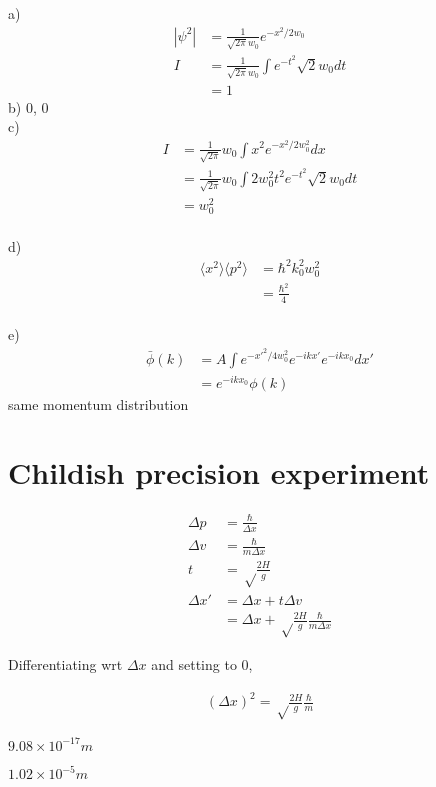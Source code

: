 \documentclass{article}
\newcommand{\<}{\langle}
\renewcommand{\>}{\rangle}
\newcommand{\D}{\Delta}
\begin{document}
a)
\begin{align*}
|\psi^2| &= \frac{1}{\sqrt{2\pi} w_0} e^{-x^2/2w_0} \\
I &= \frac{1}{\sqrt{2\pi} w_0} \int e^{-t^2} \sqrt 2 w_0 dt \\
&= 1
\end{align*}
b) 0, 0
\\
c) 
\begin{align*}
I &= \frac{1}{\sqrt{2\pi}}w_0 \int x^2 e^{-x^2/2w_0^2} dx \\
&= \frac{1}{\sqrt{2\pi}}w_0 \int 2w_0^2t^2 e^{-t^2} \sqrt 2 w_0 dt \\
&= w_0^2
\end{align*}
\\
d) 
\begin{align*}
\<x^2\> \<p^2\> &= \hbar^2 k_0^2 w_0^2 \\
&= \frac{\hbar^2}{4}
\end{align*}
\\
e) 
\begin{align*}
\bar\phi(k) &= A\int e^{-x'^2/4w_0^2} e^{-ikx'}e^{-ikx_0} dx' \\
&= e^{-ikx_0}\phi(k)
\end{align*}
same momentum distribution

\section{Childish precision experiment}

\begin{align*}
\D p &= \frac{\hbar}{\D x} \\
\D v &= \frac{\hbar}{m \D x} \\
t &= \sqrt\frac{2H}{g} \\
\D x' &= \D x + t\D v \\
&= \D x + \sqrt\frac{2H}{g} \frac{\hbar}{m\D x}
\end{align*}

Differentiating wrt $\D x$ and setting to $0$,

\begin{align*}
(\D x)^2 = \sqrt\frac{2H}{g} \frac{\hbar}{m}
\end{align*}

$9.08 \times 10^{-17}m$

$1.02 \times 10^{-5}m$
\end{document}
